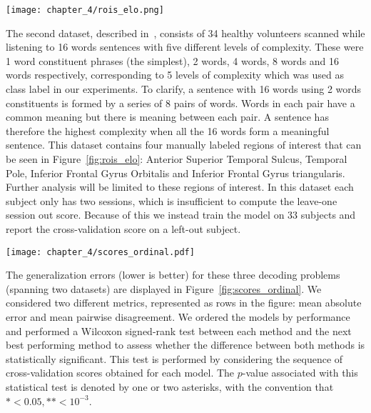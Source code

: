 \begin{marginfigure}[4cm]
\texttt{[image: chapter\_4/rois\_elo.png]}
\caption{Manually labeled ROIs in the \emph{language complexity} dataset~\citep{Cauvet2012thesis}.}\label{fig:rois_elo}
\end{marginfigure}

The second dataset, described
in~\citep{Cauvet2012thesis}, consists of 34 healthy volunteers scanned while
listening to 16 words sentences with five different levels of complexity. These were 1
word constituent phrases (the simplest), 2 words, 4 words, 8 words and 16
words respectively, corresponding to 5 levels of complexity which was
used as class label in our experiments. To clarify, a sentence
with 16 words using 2 words constituents is formed by a series of 8 pairs
of words. Words in each pair have a common meaning but there is meaning
between each pair. A sentence has therefore the highest complexity when all
the 16 words form a meaningful sentence. This dataset contains four manually labeled regions of interest that can be seen in Figure~\ref{fig:rois_elo}: Anterior
Superior Temporal Sulcus, Temporal Pole, Inferior Frontal Gyrus Orbitalis and Inferior Frontal Gyrus triangularis. Further analysis will be limited to these regions of interest. In this dataset each subject only has two sessions, which is insufficient to compute the leave-one session out score. Because of this we instead train the model on 33 subjects and report the cross-validation score on a left-out subject.

\begin{figure*}[t]
\texttt{[image: chapter\_4/scores\_ordinal.pdf]}
\caption[-4cm]{Generalization errors (lower is better) for three fMRI decoding problems. Two different metrics are used corresponding to the rows in the figure: mean absolute error and mean pairwise disagreement. The $*$ symbol represents the $p$-value associated with a Wilcoxon signed-rank test. This test is used to determine whether a given method outperforms significantly the next best-performing method.}\label{fig:scores_ordinal}
\end{figure*}


The generalization errors (lower is better) for these three decoding problems (spanning two datasets) are displayed in Figure~\ref{fig:scores_ordinal}. We considered two different metrics, represented as rows in the figure: mean absolute error and mean pairwise disagreement. We ordered the models by performance and performed a Wilcoxon signed-rank test between each method and the next best performing method to assess whether the difference between both methods is statistically significant. This test is performed by considering the sequence of cross-validation scores obtained for each model. The $p$-value associated with this statistical test is denoted by one or two asterisks, with the convention that $* < 0.05, ** < 10^{-3}$.



